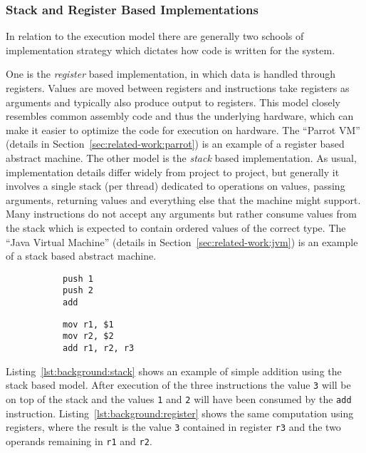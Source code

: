 \subsubsection{Stack and Register Based Implementations}
\label{sec:background:stack-vs-register}

In relation to the execution model there are generally two schools of
implementation strategy which dictates how code is written for the system.

One is the \textit{register} based implementation, in which data is handled
through registers. Values are moved between registers and instructions take
registers as arguments and typically also produce output to registers. This
model closely resembles common assembly code and thus the underlying hardware,
which can make it easier to optimize the code for execution on hardware. The
``Parrot VM'' (details in Section~\ref{sec:related-work:parrot}) is an example
of a register based abstract machine. The other model is the \textit{stack}
based implementation. As usual, implementation details differ widely from
project to project, but generally it involves a single stack (per thread)
dedicated to operations on values, passing arguments, returning values and
everything else that the machine might support. Many instructions do not accept
any arguments but rather consume values from the stack which is expected to
contain ordered values of the correct type. The ``Java Virtual Machine''
(details in Section~\ref{sec:related-work:jvm}) is an example of a stack based
abstract machine.

\begin{figure}[h]
  \centering
  \begin{subfigure}[t]{.45\textwidth}
    \begin{lstlisting}[label={lst:background:stack}, caption=Stack based addition]
push 1
push 2
add
    \end{lstlisting}
  \end{subfigure}
  \begin{subfigure}[t]{.45\textwidth}
    \begin{lstlisting}[label={lst:background:register}, caption=Register based addition]
mov r1, $1
mov r2, $2
add r1, r2, r3
    \end{lstlisting}
  \end{subfigure}
\end{figure}

Listing~\ref{lst:background:stack} shows an example of simple addition using the
stack based model. After execution of the three instructions the value
\texttt{3} will be on top of the stack and the values \texttt{1} and \texttt{2}
will have been consumed by the \texttt{add}
instruction. Listing~\ref{lst:background:register} shows the same computation
using registers, where the result is the value \texttt{3} contained in register
\texttt{r3} and the two operands remaining in \texttt{r1} and \texttt{r2}.

